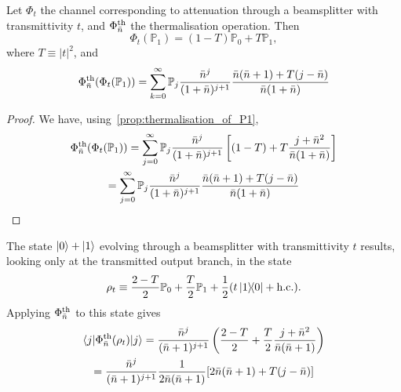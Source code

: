 \documentclass[a4paper]{report}
\newcommand{\PP}{\mathbb{P}}
\begin{document}
\begin{prop}
	Let $\Phi_t$ the channel corresponding to attenuation through a beamsplitter with transmittivity $t$, and $\Phi_{\bar n}^{\rm th}$ the thermalisation operation. Then
	\begin{equation}
		\Phi_t(\PP_1)
		= (1-T) \PP_0 + T \PP_1,
	\end{equation}
	where $T\equiv|t|^2$, and
	\begin{equation}
		\Phi_{\bar n}^{\rm th}(\Phi_t(\PP_1))
		= \sum_{k=0}^\infty
		\PP_j
		\frac{\bar n^j}{(1+\bar n)^{j+1}}
		\frac{\bar n(\bar n+1) + T(j-\bar n)}{\bar n(1+\bar n)}
	\end{equation}
	\label{prop:attenuation_and_then_thermalisation_focks}
\end{prop}
\begin{proof}
	We have, using~\cref{prop:thermalisation_of_P1},
	\begin{equation}
	\begin{gathered}
		\Phi_{\bar n}^{\rm th}(\Phi_t(\PP_1))
		= \sum_{j=0}^\infty \PP_j
		\frac{\bar n^j}{(1+\bar n)^{j+1}} \left[
		(1-T) + T \frac{j+\bar n^2}{\bar n(1+\bar n)}
		\right] \\
		= \sum_{j=0}^\infty \PP_j
		\frac{\bar n^j}{(1+\bar n)^{j+1}}
		\frac{\bar n(\bar n+1)+ T(j-\bar n)}{\bar n(1+\bar n)}
	\end{gathered}
	\end{equation}
\end{proof}

\begin{prop}
	The state $\ket0+\ket1$ evolving through a beamsplitter with transmittivity $t$ results, looking only at the transmitted output branch, in the state
	\begin{equation}
		\rho_t
		\equiv
		\frac{2-T}{2} \PP_0
		+ \frac{T}{2} \PP_1
		+ \frac12 (t \ketbra{1}{0} + \mathrm{h.c.}).
	\end{equation}
	Applying $\Phi^{\rm th}_{\bar n}$ to this state gives
	\begin{equation}
	\begin{gathered}
		\langle j|\Phi^{\rm th}_{\bar n}(\rho_t)|j\rangle
		= \frac{\bar n^j}{(\bar n + 1)^{j+1}}
		\left(
			\frac{2-T}{2}
			+ \frac{T}{2} \frac{j+\bar n^2}{\bar n(\bar n + 1)}
		\right) \\
		= \frac{\bar n^j}{(\bar n + 1)^{j+1}}
		\frac{1}{2\bar n(\bar n+1)}
		[2\bar n(\bar n+1) + T(j-\bar n)]
	\end{gathered}
	\end{equation}
\end{prop}
\end{document}
